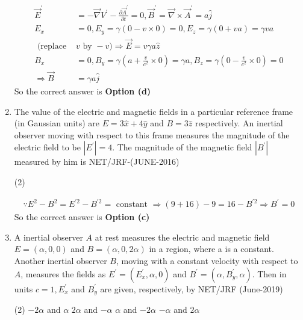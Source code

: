 \begin{enumerate}
\begin{answer}
\begin{align*}
	\vec{E}^{\prime}&=-\vec{\nabla} V^{\prime}-\frac{\partial \vec{A}^{\prime}}{\partial t}=0, \vec{B}^{\prime}=\vec{\nabla} \times \vec{A}^{\prime}=a \hat{j}\\
	E_{x}&=0, E_{y}=\gamma(0-v \times 0)=0, E_{z}=\gamma(0+v a)=\gamma v a\\
	\text { (replace }& v \text { by }-v) \Rightarrow \vec{E}=v \gamma a \hat{z}\\
	B_{x}&=0, B_{y}=\gamma\left(a+\frac{v}{c^{2}} \times 0\right)=\gamma a, B_{z}=\gamma\left(0-\frac{v}{c^{2}} \times 0\right)=0\\
	\Rightarrow \vec{B}&=\gamma a \hat{j}
	\end{align*}
	So the correct answer is \textbf{Option (d)}
\end{answer}
\item The value of the electric and magnetic fields in a particular reference frame (in Gaussian units) are $E=3 \hat{x}+4 \hat{y}$ and $B=3 \hat{z}$ respectively. An inertial observer moving with respect to this frame measures the magnitude of the electric field to be $\left|E^{\prime}\right|=4$. The magnitude of the magnetic field $\left|B^{\prime}\right|$ measured by him is
{NET/JRF-(JUNE-2016)}
 \begin{tasks}(2)
\end{tasks}
\begin{answer}
	\begin{align*}
	\because E^{2}-B^{2}=E^{\prime 2}-B^{\prime 2}=\text { constant } \Rightarrow(9+16)-9=16-B^{\prime 2} \Rightarrow B^{\prime}=0
	\end{align*}
		So the correct answer is \textbf{Option (c)}
\end{answer}
\item A inertial observer $A$ at rest measures the electric and magnetic field $E=(\alpha, 0,0)$ and $B=(\alpha, 0,2 \alpha)$ in a region, where a is a constant. Another inertial observer $B$, moving with a constant velocity with respect to $A$, measures the fields as $E^{\prime}=\left(E_{x}^{\prime}, \alpha, 0\right)$ and $B^{\prime}=\left(\alpha, B_{y}^{\prime}, \alpha\right)$. Then in units $c=1, E_{x}^{\prime}$ and $B_{y}^{\prime}$ are given, respectively, by
NET/JRF (June-2019)
 \begin{tasks}(2)
	\task[\textbf{a.}]$-2 \alpha$ and $\alpha$
	\task[\textbf{b.}] $2 \alpha$ and $-\alpha$
	\task[\textbf{c.}] $\alpha$ and $-2 \alpha$
	\task[\textbf{d.}] $-\alpha$ and $2 \alpha$
\end{tasks}

\end{enumerate}
